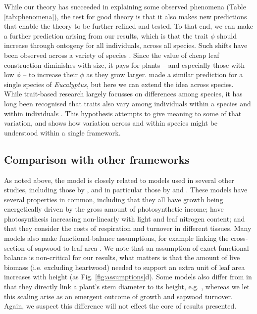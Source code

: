 \documentclass[a4paper,11pt]{article}
\begin{document}
While our theory has succeeded in explaining some observed phenomena (Table \ref{tab:phenomena}), the test for good theory is that it also makes new predictions that enable the theory to be further refined and tested. To that end, we can make a further prediction arising from our results, which is that the trait $\phi$ should increase through ontogeny for all individuals, across all species. Such shifts have been observed across a variety of species \citet{King-1999,Thomas-1999,Koch-2004}. Since the value of cheap leaf construction diminishes with size, it pays for plants -- and especially those with low $\phi$ -- to increase their $\phi$ as they grow larger. \citet{King-1999} made a similar prediction for a single species of \emph{Eucalyptus}, but here we can extend the idea across species. While trait-based research largely focusses on differences among species, it has long been recognised that traits also vary among individuals within a species and within individuals \citep{Westoby-2002}. This hypothesis attempts to give meaning to some of that variation, and shows how variation across and within species might be understood within a single framework.

\subsection{Comparison with other frameworks}

As noted above, the {\plant} model is closely related to models used in several other studies, including those by \citet{Givnish-1988, Yokozawa-1995, Makela-1997, King-1999, King-2005, Moorcroft-2001, Li-2014}, and in particular those by \citet{Makela-1997} and \citet{Moorcroft-2001}. These models have several properties in common, including that they all have growth being energetically driven by the gross amount of photosynthetic income; have photosynthesis increasing non-linearly with light and leaf nitrogen content; and that they consider the costs of respiration and turnover in different tissues. Many models also make functional-balance assumptions, for example linking the cross-section of sapwood to leaf area \citep{Givnish-1988, Yokozawa-1995, Makela-1997, King-2005, Moorcroft-2001}. We note that an assumption of exact functional balance is non-critical for our results, what matters is that the amount of live biomass (i.e. excluding heartwood) needed to support an extra unit of leaf area increases with height (as Fig. \ref{fig:assumptions}d). Some models also differ from in that they directly link a plant's stem diameter to its height, e.g. \citet{Yokozawa-1995, King-1999, Moorcroft-2001, Li-2014}, whereas we let this scaling arise as an emergent outcome of growth and sapwood turnover. Again, we suspect this difference will not effect the core of results presented.
\end{document}
